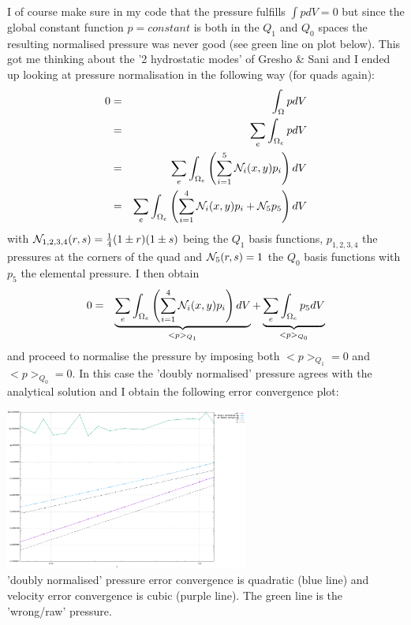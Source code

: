 I of course make sure in my code that the pressure fulfills $\int p dV=0$ but since 
the global constant function $p=constant$ is both in the $Q_1$ and $Q_0$ spaces the 
resulting normalised pressure was never good (see green line on plot below). 
This got me thinking about the '2 hydrostatic modes' of Gresho \& Sani and
I ended up looking at pressure normalisation in the following way (for quads again):
\begin{eqnarray}
0 
&=& \int_\Omega p dV \nonumber\\
&=& \sum_e \int_{\Omega_e} p dV \nonumber\\
&=& \sum_e \int_{\Omega_e} \left( \sum_{i=1}^5 {\mathcal{N}}_i(x,y) p_i \right) dV \nonumber\\
&=& \sum_e \int_{\Omega_e} \left( \sum_{i=1}^4 {\mathcal{N}}_i(x,y) p_i + {\mathcal{N}}_5 p_5 \right) dV
\end{eqnarray}
with ${\mathcal{N}}_{1,2,3,4}(r,s)=\frac14(1\pm r)(1\pm s)$ being
the $Q_1$ basis functions, $p_{1,2,3,4}$ the pressures at the corners
of the quad and ${\mathcal{N}}_5(r,s)=1$ the $Q_0$ basis functions with $p_5$ the elemental pressure.
I then obtain 
\begin{eqnarray}
0 
&=& \underbrace{\sum_e \int_{\Omega_e} \left( \sum_{i=1}^4 {\mathcal{N}}_i(x,y) p_i \right) dV}_{<p>_{Q_1}}
+ \underbrace{\sum_e \int_{\Omega_e} p_5  dV}_{<p>_{Q_0}}
\end{eqnarray}
and proceed to normalise the pressure by imposing both $<p>_{Q_1}=0$ and $<p>_{Q_0}=0$.
In this case the 'doubly normalised' pressure agrees with the analytical solution 
and I obtain the following error convergence plot:

\begin{center}
\includegraphics[width=8cm]{python_codes/fieldstone_120/images/q2q1q0}\\
{\captionfont 'doubly normalised' pressure error convergence is quadratic (blue line) and 
velocity error convergence is cubic (purple line). The green line is the 'wrong/raw' pressure. }
\end{center}




